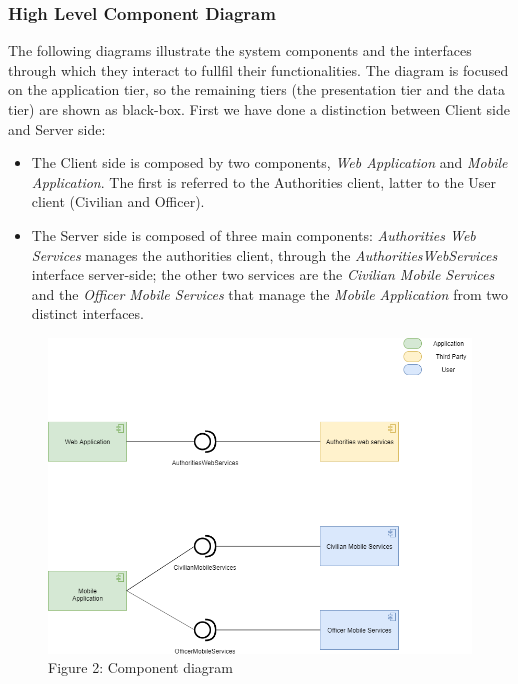 \documentclass[12pt,a4paper]{article}
\begin{document}
\subsubsection{High Level Component Diagram}
The following diagrams illustrate the system components and the interfaces through which they interact to fullfil their functionalities. The diagram is focused on the application tier, so the remaining tiers (the presentation tier and the data tier) are shown as black-box.
First we have done a distinction between Client side and Server side:
\begin{itemize}
\item The Client side is composed by two components, \textit{Web Application} and \textit{Mobile Application}. The first is referred to the Authorities client, latter to the User client (Civilian and Officer).
\item The Server side is composed of three main components: \textit{Authorities Web Services} manages the authorities client, through the \textit{AuthoritiesWebServices} interface server-side; the other two services are the \textit{Civilian Mobile Services} and the \textit{Officer Mobile Services} that manage  the \textit{Mobile Application} from two distinct interfaces.
\end{itemize}
\begin{figure}[H]
		\centering
			\includegraphics[width=1.0\linewidth]{Images/ComponentDiagram}
		\caption{Figure 2: Component diagram}
\end{figure}
\end{document}
